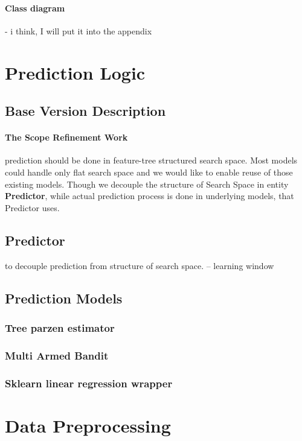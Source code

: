 \paragraph{Class diagram} - i think, I will put it into the appendix


\section{Prediction Logic}\label{implementation: prediction logic}
\subsection{Base Version Description}
\paragraph{The Scope Refinement Work} prediction should be done in feature-tree structured search space. Most models could handle only flat search space and we would like to enable reuse of those existing models. Though we decouple the structure of Search Space in entity \textbf{Predictor}, while actual prediction process is done in underlying models, that Predictor uses.

\subsection{Predictor}
to decouple prediction from structure of search space.
-- learning window

\subsection{Prediction Models}\label{implementation: prediction models}
\subsubsection{Tree parzen estimator}
\subsubsection{Multi Armed Bandit}
\subsubsection{Sklearn linear regression wrapper}


\section{Data Preprocessing}
